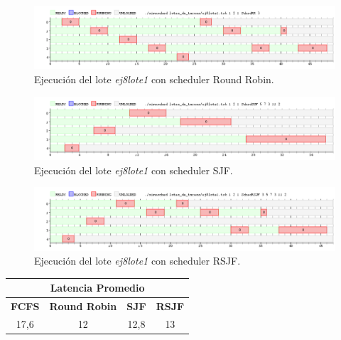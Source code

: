 \begin{figure}[!h]
	\begin{center}
		\includegraphics[width=500px]{imagenes/ej8_prueba1_rr.png}
		\caption{Ejecución del lote \emph{ej8lote1} con scheduler Round Robin.}
		\label{fig:grafico_ej8_prueba1_rr}
	\end{center}
\end{figure}

\begin{figure}[!h]
	\begin{center}
		\includegraphics[width=500px]{imagenes/ej8_prueba1_sjf.png}
		\caption{Ejecución del lote \emph{ej8lote1} con scheduler SJF.}
		\label{fig:grafico_ej8_prueba1_sjf}
	\end{center}
\end{figure}

\begin{figure}[!h]
	\begin{center}
		\includegraphics[width=500px]{imagenes/ej8_prueba1_rsjf.png}
		\caption{Ejecución del lote \emph{ej8lote1} con scheduler RSJF.}
		\label{fig:grafico_ej8_prueba1_rsjf}
	\end{center}
\end{figure}

\begin{center}
	\begin{tabular}{|c|c|c|c|}
		\hline
		\multicolumn{4}{|c|}{\large{\textbf{Latencia Promedio}}} \\
		\hline
		\textbf{FCFS} & \textbf{Round Robin} & \textbf{SJF} & \textbf{RSJF} \\
		\hline
		17,6 & 12 & 12,8 & 13 \\
		\hline
	\end{tabular}
\end{center}

